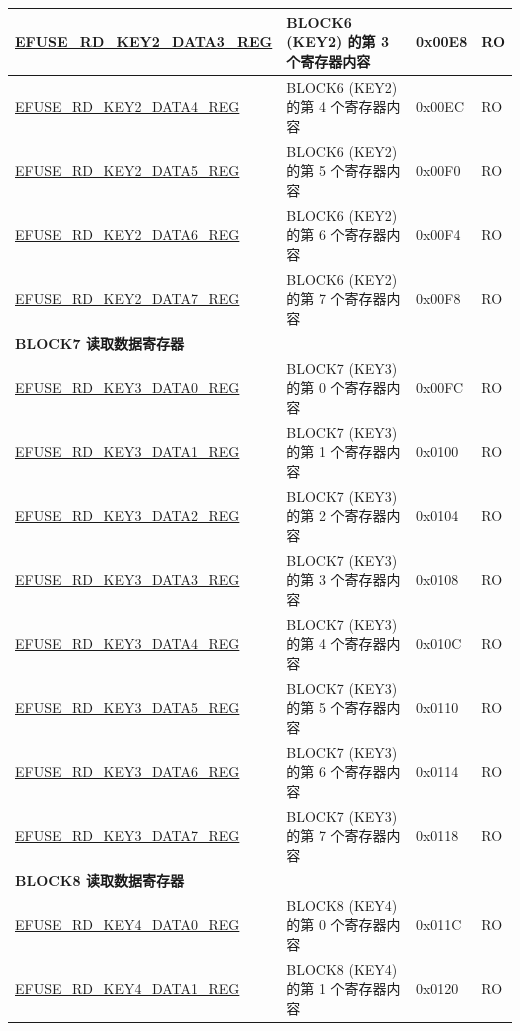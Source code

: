 \begin{longtable}{ | p{7cm} | p{7.2cm} | p{1.3cm} | p{1cm} | }
\hyperref[regdesc:EFUSERDKEY2DATANREG]{EFUSE\_RD\_KEY2\_DATA3\_REG} & BLOCK6 (KEY2) 的第 3 个寄存器内容 & 0x00E8 & RO \\ \hline
\hyperref[regdesc:EFUSERDKEY2DATANREG]{EFUSE\_RD\_KEY2\_DATA4\_REG} & BLOCK6 (KEY2) 的第 4 个寄存器内容 & 0x00EC & RO \\ \hline
\hyperref[regdesc:EFUSERDKEY2DATANREG]{EFUSE\_RD\_KEY2\_DATA5\_REG} & BLOCK6 (KEY2) 的第 5 个寄存器内容 & 0x00F0 & RO \\ \hline
\hyperref[regdesc:EFUSERDKEY2DATANREG]{EFUSE\_RD\_KEY2\_DATA6\_REG} & BLOCK6 (KEY2) 的第 6 个寄存器内容 & 0x00F4 & RO \\ \hline
\hyperref[regdesc:EFUSERDKEY2DATANREG]{EFUSE\_RD\_KEY2\_DATA7\_REG} & BLOCK6 (KEY2) 的第 7 个寄存器内容 & 0x00F8 & RO \\ \hline
\multicolumn{4}{|l|}{\textbf{BLOCK7 读取数据寄存器}} \\ \hline
\hyperref[regdesc:EFUSERDKEY3DATANREG]{EFUSE\_RD\_KEY3\_DATA0\_REG} & BLOCK7 (KEY3) 的第 0 个寄存器内容 & 0x00FC & RO \\ \hline
\hyperref[regdesc:EFUSERDKEY3DATANREG]{EFUSE\_RD\_KEY3\_DATA1\_REG} & BLOCK7 (KEY3) 的第 1 个寄存器内容 & 0x0100 & RO \\ \hline
\hyperref[regdesc:EFUSERDKEY3DATANREG]{EFUSE\_RD\_KEY3\_DATA2\_REG} & BLOCK7 (KEY3) 的第 2 个寄存器内容 & 0x0104 & RO \\ \hline
\hyperref[regdesc:EFUSERDKEY3DATANREG]{EFUSE\_RD\_KEY3\_DATA3\_REG} & BLOCK7 (KEY3) 的第 3 个寄存器内容 & 0x0108 & RO \\ \hline
\hyperref[regdesc:EFUSERDKEY3DATANREG]{EFUSE\_RD\_KEY3\_DATA4\_REG} & BLOCK7 (KEY3) 的第 4 个寄存器内容 & 0x010C & RO \\ \hline
\hyperref[regdesc:EFUSERDKEY3DATANREG]{EFUSE\_RD\_KEY3\_DATA5\_REG} & BLOCK7 (KEY3) 的第 5 个寄存器内容 & 0x0110 & RO \\ \hline
\hyperref[regdesc:EFUSERDKEY3DATANREG]{EFUSE\_RD\_KEY3\_DATA6\_REG} & BLOCK7 (KEY3) 的第 6 个寄存器内容 & 0x0114 & RO \\ \hline
\hyperref[regdesc:EFUSERDKEY3DATANREG]{EFUSE\_RD\_KEY3\_DATA7\_REG} & BLOCK7 (KEY3) 的第 7 个寄存器内容 & 0x0118 & RO \\ \hline
\multicolumn{4}{|l|}{\textbf{BLOCK8 读取数据寄存器}} \\ \hline
\hyperref[regdesc:EFUSERDKEY4DATANREG]{EFUSE\_RD\_KEY4\_DATA0\_REG} & BLOCK8 (KEY4) 的第 0 个寄存器内容 & 0x011C & RO \\ \hline
\hyperref[regdesc:EFUSERDKEY4DATANREG]{EFUSE\_RD\_KEY4\_DATA1\_REG} & BLOCK8 (KEY4) 的第 1 个寄存器内容 & 0x0120 & RO \\ \hline

\end{longtable}
